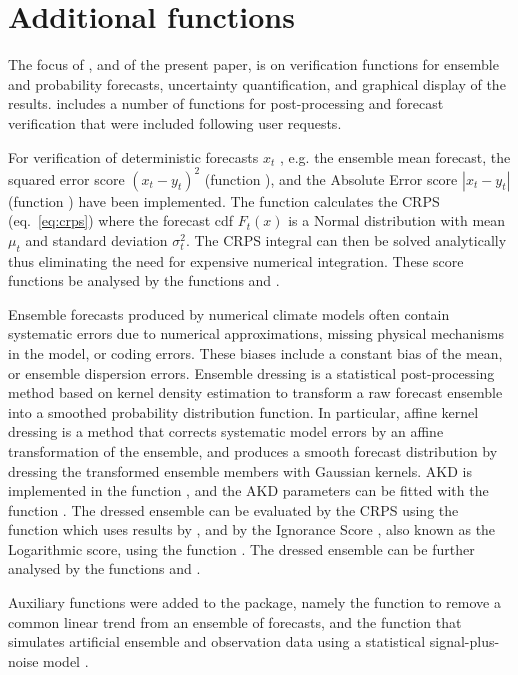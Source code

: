 \documentclass[article]{jss}\usepackage[]{graphicx}\usepackage[]{color}
\begin{document}
\section{Additional functions}

The focus of , and of the present paper, is on verification functions for ensemble and probability forecasts, uncertainty quantification, and graphical display of the results.
 includes a number of functions for post-processing and forecast verification that were included following user requests.


For verification of deterministic forecasts $x_t$ , e.g. the ensemble mean forecast, the squared error score $(x_t - y_t)^2$ (function ), and the Absolute Error score $|x_t - y_t|$ (function ) have been implemented.
The function  calculates the CRPS (eq.~\ref{eq:crps}) where the forecast cdf $F_t(x)$ is a Normal distribution with mean $\mu_t$ and standard deviation $\sigma^2_t$.
The CRPS integral can then be solved analytically \citep{gneiting2005calibrated} thus eliminating the need for expensive numerical integration.
These score functions be analysed by the functions  and .


Ensemble forecasts produced by numerical climate models often contain systematic errors due to numerical approximations, missing physical mechanisms in the model, or coding errors.
These biases include a constant bias of the mean, or ensemble dispersion errors.
Ensemble dressing is a statistical post-processing method based on kernel density estimation to transform a raw forecast ensemble into a smoothed probability distribution function.
In particular, affine kernel dressing \citep[AKD; ][]{broecker2008from} is a method that corrects systematic model errors by an affine transformation of the ensemble, and produces a smooth forecast distribution by dressing the transformed ensemble members with Gaussian kernels.
AKD is implemented in the function , and the AKD parameters can be fitted with the function . 
The dressed ensemble can be evaluated by the CRPS using the function  which uses results by \citet{grimit2006the}, and by the Ignorance Score \citep{roulston2002evaluating}, also known as the Logarithmic score, using the function .
The dressed ensemble can be further analysed by the functions  and .

Auxiliary functions were added to the package, namely the function  to remove a common linear trend from an ensemble of forecasts, and the function  that simulates artificial ensemble and observation data using a statistical signal-plus-noise model \citep{siegert2016bayesian}.
\end{document}
